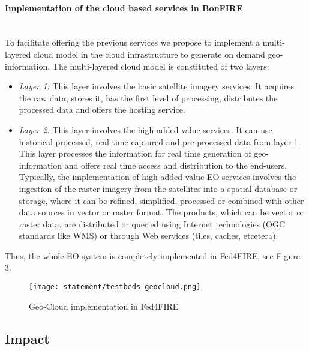 \paragraph{Implementation of the cloud based services in BonFIRE}~\\
To facilitate offering the previous services we propose to implement a multi-layered cloud model in the \bonfire cloud infrastructure to generate on demand geo-information. The multi-layered cloud model is constituted of two layers:
\begin{itemize}
\item \emph{Layer 1:} This layer involves the basic satellite imagery services.  It acquires the raw data, stores it, has the first level of processing, distributes the processed data and offers the hosting service.

\item \emph{Layer 2:} This layer involves the high added value services. It can use historical processed, real time captured and pre-processed data from layer 1. This layer processes the information for real time generation of geo-information and offers real time access and distribution to the end-users. Typically, the implementation of high added value EO services involves the ingestion of the raster imagery from the satellites into a spatial database or storage, where it can be refined, simplified, processed or combined with other data sources in vector or raster format. The products, which can be vector or raster data, are distributed or queried using Internet technologies (OGC standards like WMS) or through Web services (tiles, caches, etcetera).
\end{itemize}

Thus, the whole EO system is completely implemented in Fed4FIRE, see Figure 3.

\begin{figure}[!h]
\begin{center}
\texttt{[image: statement/testbeds-geocloud.png]}
\caption{Geo-Cloud implementation in Fed4FIRE}
\label{fig:intr-testbeds-geocloud}
\end{center}
\end{figure}




\subsection{Impact}
